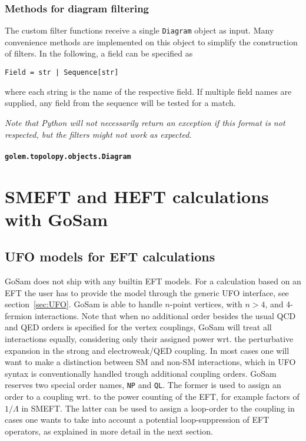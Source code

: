 \documentclass[11pt,a4paper]{refrep}
\newcommand{\gosam}{{\sc GoSam}\xspace}
\begin{document}
\subsection{Methods for diagram filtering}
The custom filter functions receive a single \texttt{Diagram} object as input. Many convenience methods are implemented on this object to simplify the construction of filters. In the following, a field can be specified as 
\begin{lstlisting}[style=py]
   Field = str | Sequence[str]
\end{lstlisting}
where each string is the name of the respective field. If multiple field names are supplied, any field from the sequence will be tested for a match.

\emph{Note that Python will not necessarily return an exception if this format is not respected, but the filters might not work as expected.} 

\subsubsection{\texttt{golem.topolopy.objects.Diagram}}
\begin{adjustwidth}{-100pt}{0pt}

\end{adjustwidth}



\chapter{SMEFT and HEFT calculations with \gosam}
\label{sec:EFT}

\section{UFO models for EFT calculations}
\gosam does not ship with any builtin EFT models. For a calculation based on an EFT the user has to provide the model through the generic UFO interface, see section~\ref{sec:UFO}. \gosam is able to handle $n$-point vertices, with $n>4$, and 4-fermion interactions. Note that when no additional order besides the usual QCD and QED orders is specified for the vertex couplings, \gosam will treat all interactions equally, considering only their assigned power wrt. the perturbative expansion in the strong and electroweak/QED coupling. In most cases one will want to make a distinction between SM and non-SM interactions, which in UFO syntax is conventionally handled trough additional coupling orders. \gosam reserves two special order names, \texttt{NP} and \texttt{QL}. The former is used to assign an order to a coupling wrt. to the power counting of the EFT, for example factors of $1/\Lambda$ in SMEFT. The latter can be used to assign a loop-order to the coupling in cases one wants to take into account a potential loop-suppression of EFT operators, as explained in more detail in the next section.
\end{document}
